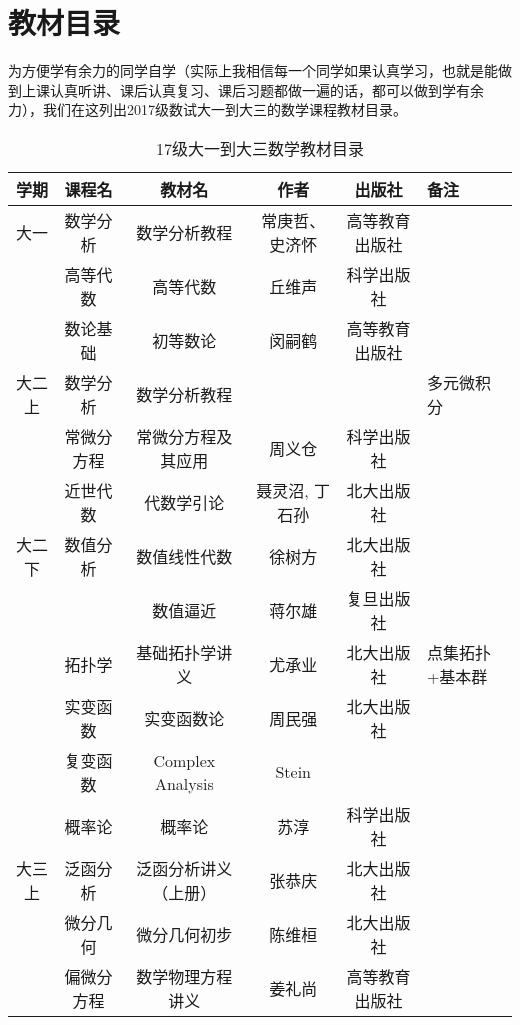 \section{教材目录}
为方便学有余力的同学自学（实际上我相信每一个同学如果认真学习，也就是能做到上课认真听讲、课后认真复习、课后习题都做一遍的话，都可以做到学有余力），我们在这列出2017级数试大一到大三的数学课程教材目录。

    \begin{table}[h]   
    \begin{tabular}{c|c|c|c|c|l}
        \hline
        \hline
        学期 & 课程名 & 教材名 & 作者 & 出版社 & 备注\\
        \hline
        大一  & 数学分析 & 数学分析教程   & 常庚哲、史济怀 & 高等教育出版社  &  \\ \hline
              & 高等代数 & 高等代数	& 丘维声	&科学出版社	& \\ \hline
              & 数论基础 & 初等数论	& 闵嗣鹤	&高等教育出版社&  \\ \hline	
        大二上	&数学分析	&数学分析教程	&	&	&多元微积分  \\ \hline
               &常微分方程	&常微分方程及其应用	&周义仓	&科学出版社&\\ \hline
               &近世代数	&代数学引论	&聂灵沼, 丁石孙	&北大出版社&\\ \hline
        大二下	 &数值分析	&数值线性代数&  徐树方	&	北大出版社&\\ \hline
                &        &数值逼近	& 蒋尔雄	&复旦出版社&\\ \hline
                &拓扑学&	基础拓扑学讲义	&尤承业	&北大出版社& \tiny{点集拓扑+基本群} \\  \hline
                &实变函数	&实变函数论	&周民强	&北大出版社&\\ \hline
                &复变函数	&Complex Analysis&	Stein &	&\\ \hline
                &概率论	&概率论	&苏淳	&科学出版社&\\ \hline     
        大三上  &泛函分析  &泛函分析讲义（上册） &张恭庆 &北大出版社 &\\ \hline
                & 微分几何  & 微分几何初步 & 陈维桓 &北大出版社 &\\ \hline
                &偏微分方程 & 数学物理方程讲义 &姜礼尚 & 高等教育出版社 &\\ \hline  
        \hline
    \end{tabular}  
    \caption{17级大一到大三数学教材目录}
    \end{table}  
